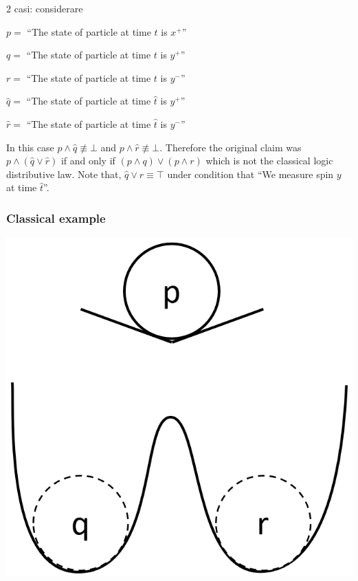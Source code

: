 \documentclass[10pt,twocolumn, nofootinbib]{revtex4-1}
\begin{document}
2 casi: considerare

\begin{description}
    \item $p =$ ``The state of particle at time $t$ is $x^+$''
    \item $q =$ ``The state of particle at time $t$ is $y^+$''
    \item $r =$ ``The state of particle at time $t$ is $y^-$''
    \item $\hat{q} =$ ``The state of particle at time $\hat{t}$ is $y^+$''
    \item $\hat{r} =$ ``The state of particle at time $\hat{t}$ is $y^-$''
\end{description}

In this case $p \wedge \hat{q} \nequiv \bot$ and $p \wedge \hat{r} \nequiv \bot$. Therefore the original claim was $p \wedge (\hat{q} \vee \hat{r})$ if and only if $(p \wedge  q) \vee (p \wedge r)$ which is not the classical logic distributive law. Note that, $\hat{q} \vee \hat{r} \equiv \top$ under condition that ``We measure spin $y$ at time $\hat{t}$''.

\subsubsection{Classical example}
\includegraphics[width=\columnwidth]{Balldrop.png}
\end{document}
